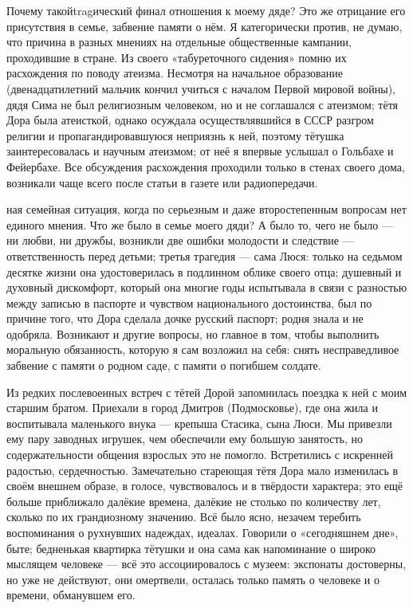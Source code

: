\label{51-1}
Почему такойtragический финал отношения к моему дяде? Это же отрицание его присутствия в семье, забвение памяти о нём. Я категорически против, не думаю, что причина в разных мнениях на отдельные общественные кампании, проходившие в стране. Из своего «табуреточного сидения» помню их расхождения по поводу атеизма. Несмотря на начальное образование (двенадцатилетний мальчик кончил учиться с началом Первой мировой войны), дядя Сима не был религиозным человеком, но и не соглашался с атеизмом; тётя Дора была атеисткой, однако осуждала осуществлявшийся в СССР разгром религии и пропагандировавшуюся неприязнь к ней, поэтому тётушка заинтересовалась и научным атеизмом; от неё я впервые услышал о Гольбахе и Фейербахе. Все обсуждения расхождения проходили только в стенах своего дома, возникали чаще всего после статьи в газете или радиопередачи.

\label{52-1}
ная семейная ситуация, когда по серьезным и даже второстепенным вопросам нет единого мнения. Что же было в семье моего дяди? А было то, чего не было — ни любви, ни дружбы, возникли две ошибки молодости и следствие — ответственность перед детьми; третья трагедия — сама Люся: только на седьмом десятке жизни она удостоверилась в подлинном облике своего отца; душевный и духовный дискомфорт, который она многие годы испытывала в связи с разностью между записью в паспорте и чувством национального достоинства, был по причине того, что Дора сделала дочке русский паспорт; родня знала и не одобряла. Возникают и другие вопросы, но главное в том, чтобы выполнить моральную обязанность, которую я сам возложил на себя: снять несправедливое забвение с памяти о родном саде, с памяти о погибшем солдате.

\label{53-1}
Из редких послевоенных встреч с тётей Дорой запомнилась поездка к ней с моим старшим братом. Приехали в город Дмитров (Подмосковье), где она жила и воспитывала маленького внука — крепыша Стасика, сына Люси. Мы привезли ему пару заводных игрушек, чем обеспечили ему большую занятость, но содержательности общения взрослых это не помогло. Встретились с искренней радостью, сердечностью. Замечательно стареющая тётя Дора мало изменилась в своём внешнем образе, в голосе, чувствовалось и в твёрдости характера; это ещё больше приближало далёкие времена, далёкие не столько по количеству лет, сколько по их грандиозному значению. Всё было ясно, незачем теребить воспоминания о рухнувших надеждах, идеалах. Говорили о «сегодняшнем дне», быте; бедненькая квартирка тётушки и она сама как напоминание о широко мыслящем человеке — всё это ассоциировалось с музеем: экспонаты достоверны, но уже не действуют, они омертвели, осталась только память о человеке и о времени, обманувшем его.
